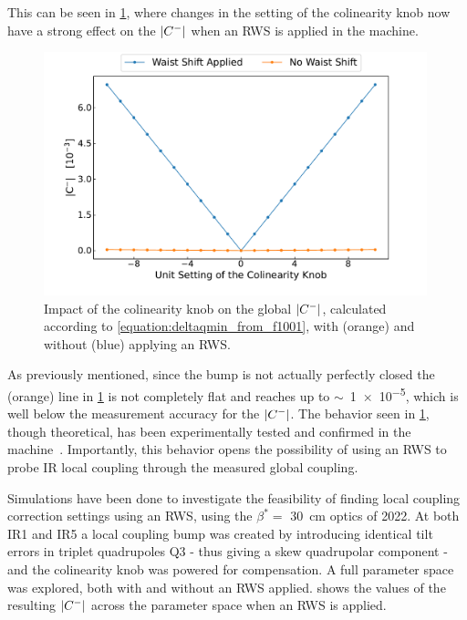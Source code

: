 This can be seen in \cref{figure:knob_to_cminus_with_waist}, where changes in the setting of the colinearity knob now have a strong effect on the \(\left\lvert C^{-} \right\rvert\) when an RWS is applied in the machine.

\begin{figure}[!htb]
    \centering
    \includegraphics*[width=0.99\textwidth]{Figures/IR_Coupling_Correction/colin_knob_vs_waist_shift.pdf}
    \caption{Impact of the colinearity knob on the global \(\left\lvert C^{-} \right\rvert\), calculated according to \cref{equation:deltaqmin_from_f1001}, with (\textcolor{mplorange}{orange}) and without (\textcolor{mplblue}{blue}) applying an RWS.}
    \label{figure:knob_to_cminus_with_waist}
\end{figure}

As previously mentioned, since the bump is not actually perfectly closed the (\textcolor{mplorange}{orange}) line in \cref{figure:knob_to_cminus_with_waist} is not completely flat and reaches up to \(\sim\)~\num{1e-5}, which is well below the measurement accuracy for the \(\left\lvert C^{-} \right\rvert\).
The behavior seen in \cref{figure:knob_to_cminus_with_waist}, though theoretical, has been experimentally tested and confirmed in the machine~\cite{CERN:Persson:Local_Coupling_IP}.
Importantly, this behavior opens the possibility of using an RWS to probe IR local coupling through the measured global coupling.
\newline

Simulations have been done to investigate the feasibility of finding local coupling correction settings using an RWS, using the \(\beta^{\ast} = \) \qty{30}{cm} optics of \num{2022}.
At both IR\num{1} and IR\num{5} a local coupling bump was created by introducing identical tilt errors in triplet quadrupoles Q\num{3} - thus giving a skew quadrupolar component - and the colinearity knob was powered for compensation.
A full parameter space was explored, both with and without an RWS applied.
 shows the values of the resulting \(\left\lvert C^{-} \right\rvert\) across the parameter space when an RWS is applied.

